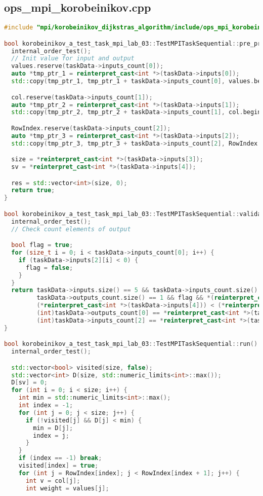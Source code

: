 \documentclass[12pt]{article}
\begin{document}
\subsection*{ops\_mpi\_korobeinikov.cpp}
\begin{lstlisting}[language=C++]
#include "mpi/korobeinikov_dijkstras_algorithm/include/ops_mpi_korobeinikov.hpp"

bool korobeinikov_a_test_task_mpi_lab_03::TestMPITaskSequential::pre_processing() {
  internal_order_test();
  // Init value for input and output
  values.reserve(taskData->inputs_count[0]);
  auto *tmp_ptr_1 = reinterpret_cast<int *>(taskData->inputs[0]);
  std::copy(tmp_ptr_1, tmp_ptr_1 + taskData->inputs_count[0], values.begin());

  col.reserve(taskData->inputs_count[1]);
  auto *tmp_ptr_2 = reinterpret_cast<int *>(taskData->inputs[1]);
  std::copy(tmp_ptr_2, tmp_ptr_2 + taskData->inputs_count[1], col.begin());

  RowIndex.reserve(taskData->inputs_count[2]);
  auto *tmp_ptr_3 = reinterpret_cast<int *>(taskData->inputs[2]);
  std::copy(tmp_ptr_3, tmp_ptr_3 + taskData->inputs_count[2], RowIndex.begin());

  size = *reinterpret_cast<int *>(taskData->inputs[3]);
  sv = *reinterpret_cast<int *>(taskData->inputs[4]);

  res = std::vector<int>(size, 0);
  return true;
}

bool korobeinikov_a_test_task_mpi_lab_03::TestMPITaskSequential::validation() {
  internal_order_test();
  // Check count elements of output

  bool flag = true;
  for (size_t i = 0; i < taskData->inputs_count[0]; i++) {
    if (taskData->inputs[2][i] < 0) {
      flag = false;
    }
  }
  return taskData->inputs.size() == 5 && taskData->inputs_count.size() == 5 && taskData->outputs.size() == 1 &&
         taskData->outputs_count.size() == 1 && flag && *(reinterpret_cast<int *>(taskData->inputs[4])) >= 0 &&
         (*reinterpret_cast<int *>(taskData->inputs[4])) < (*reinterpret_cast<int *>(taskData->inputs[3])) &&
         (int)taskData->outputs_count[0] == *reinterpret_cast<int *>(taskData->inputs[3]) &&
         (int)taskData->inputs_count[2] == *reinterpret_cast<int *>(taskData->inputs[3]) + 1;
}

bool korobeinikov_a_test_task_mpi_lab_03::TestMPITaskSequential::run() {
  internal_order_test();

  std::vector<bool> visited(size, false);
  std::vector<int> D(size, std::numeric_limits<int>::max());
  D[sv] = 0;
  for (int i = 0; i < size; i++) {
    int min = std::numeric_limits<int>::max();
    int index = -1;
    for (int j = 0; j < size; j++) {
      if (!visited[j] && D[j] < min) {
        min = D[j];
        index = j;
      }
    }
    if (index == -1) break;
    visited[index] = true;
    for (int j = RowIndex[index]; j < RowIndex[index + 1]; j++) {
      int v = col[j];
      int weight = values[j];


\end{lstlisting}
\end{document}
